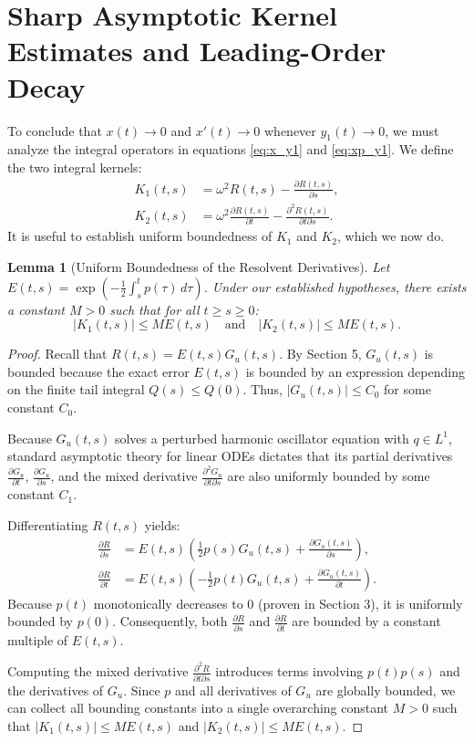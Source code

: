 \documentclass[10pt,reqno]{amsart}
\newtheorem{lemma}[theorem]{Lemma}
\theoremstyle{definition}
\begin{document}
		\section{Sharp Asymptotic Kernel Estimates and Leading-Order Decay}
	
	To conclude that $x(t) \to 0$ and $x'(t) \to 0$ whenever $y_1(t) \to 0$, we must analyze the integral operators in equations \eqref{eq:x_y1} and \eqref{eq:xp_y1}. We define the two integral kernels:
	\begin{align}
		K_1(t, s) &= \omega^2 R(t, s) - \frac{\partial R(t, s)}{\partial s}, \\
		K_2(t, s) &= \omega^2 \frac{\partial R(t, s)}{\partial t} - \frac{\partial^2 R(t, s)}{\partial t \partial s}.
	\end{align}
	It is useful to establish uniform boundedness of $K_1$ and $K_2$, which we now do. 
		\begin{lemma}[Uniform Boundedness of the Resolvent Derivatives] \label{lem:kernel_bounds}
		Let $E(t, s) = \exp\left(-\frac{1}{2}\int_s^t p(\tau) \, d\tau\right)$. Under our established hypotheses, there exists a constant $M > 0$ such that for all $t \ge s \ge 0$:
		\[ |K_1(t, s)| \le M E(t, s) \quad \text{and} \quad |K_2(t, s)| \le M E(t, s). \]
	\end{lemma}
	
	\begin{proof}
		Recall that $R(t, s) = E(t, s) G_u(t, s)$. By Section 5, $G_u(t, s)$ is bounded because the exact error $E(t, s)$ is bounded by an expression depending on the finite tail integral $Q(s) \le Q(0)$. Thus, $|G_u(t, s)| \le C_0$ for some constant $C_0$.
		
		Because $G_u(t, s)$ solves a perturbed harmonic oscillator equation with $q \in L^1$, standard asymptotic theory for linear ODEs dictates that its partial derivatives $\frac{\partial G_u}{\partial t}$, $\frac{\partial G_u}{\partial s}$, and the mixed derivative $\frac{\partial^2 G_u}{\partial t \partial s}$ are also uniformly bounded by some constant $C_1$.
		
		Differentiating $R(t, s)$ yields:
		\begin{align*}
			\frac{\partial R}{\partial s} &= E(t, s) \left( \frac{1}{2}p(s)G_u(t, s) + \frac{\partial G_u(t, s)}{\partial s} \right), \\
			\frac{\partial R}{\partial t} &= E(t, s) \left( -\frac{1}{2}p(t)G_u(t, s) + \frac{\partial G_u(t, s)}{\partial t} \right).
		\end{align*}
		Because $p(t)$ monotonically decreases to $0$ (proven in Section 3), it is uniformly bounded by $p(0)$. Consequently, both $\frac{\partial R}{\partial s}$ and $\frac{\partial R}{\partial t}$ are bounded by a constant multiple of $E(t, s)$. 
		
		Computing the mixed derivative $\frac{\partial^2 R}{\partial t \partial s}$ introduces terms involving $p(t)p(s)$ and the derivatives of $G_u$. Since $p$ and all derivatives of $G_u$ are globally bounded, we can collect all bounding constants into a single overarching constant $M > 0$ such that $|K_1(t, s)| \le M E(t, s)$ and $|K_2(t, s)| \le M E(t, s)$.
	\end{proof}
 
\end{document}
